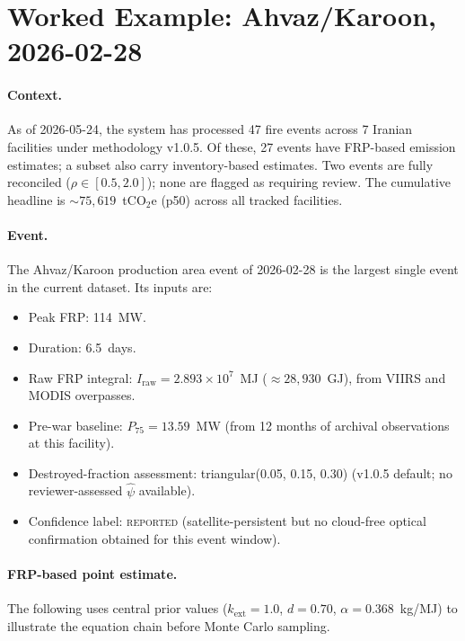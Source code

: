 \documentclass[11pt]{article}
\begin{document}
\section{Worked Example: Ahvaz/Karoon, 2026-02-28}
\label{sec:example}

\paragraph{Context.}
As of 2026-05-24, the system has processed 47 fire events across 7 Iranian
facilities under methodology v1.0.5. Of these, 27 events have FRP-based
emission estimates; a subset also carry inventory-based estimates. Two
events are fully reconciled ($\rho \in [0.5, 2.0]$); none are flagged as
requiring review. The cumulative headline is
${\sim}75{,}619$~tCO$_2$e (p50) across all tracked facilities.

\paragraph{Event.}
The Ahvaz/Karoon production area event of 2026-02-28 is the largest single
event in the current dataset. Its inputs are:
\begin{itemize}
\item Peak FRP: 114~MW.
\item Duration: 6.5~days.
\item Raw FRP integral: $I_{\mathrm{raw}} = 2.893 \times 10^{7}$~MJ
  ($\approx 28{,}930$~GJ), from VIIRS and MODIS overpasses.
\item Pre-war baseline: $P_{75} = 13.59$~MW (from 12 months of archival
  observations at this facility).
\item Destroyed-fraction assessment: triangular(0.05, 0.15, 0.30)
  (v1.0.5 default; no reviewer-assessed $\hat\psi$ available).
\item Confidence label: \textsc{reported} (satellite-persistent but no
  cloud-free optical confirmation obtained for this event window).
\end{itemize}

\paragraph{FRP-based point estimate.}
The following uses central prior values
($k_{\mathrm{ext}} = 1.0$, $d = 0.70$, $\alpha = 0.368$~kg/MJ) to
illustrate the equation chain before Monte Carlo sampling.
\end{document}
